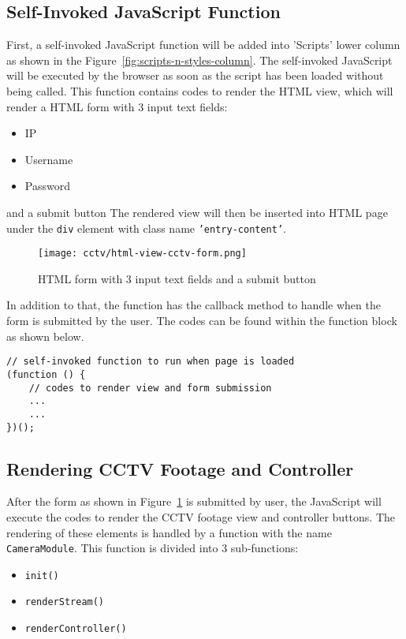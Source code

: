 \subsection{Self-Invoked JavaScript Function}
First, a self-invoked JavaScript function will be added into 'Scripts' lower column as shown in the Figure~\ref{fig:scripts-n-styles-column}. The self-invoked JavaScript will be executed by the browser as soon as the script has been loaded without being called. This function contains codes to render the HTML view, which will render a HTML form with 3 input text fields:
\begin{itemize}
\item IP
\item Username
\item Password
\end{itemize}
and a submit button The rendered view will then be inserted into HTML page under the \texttt{div} element with class name \texttt{'entry-content'}.

\begin{figure}[h]
\caption{HTML form with 3 input text fields and a submit button}
\label{fig:html-view-cctv-form}
\centering
\texttt{[image: cctv/html-view-cctv-form.png]}
\end{figure}

In addition to that, the function has the callback method to handle when the form is submitted by the user. The codes can be found within the function block as shown below.
\begin{lstlisting}
// self-invoked function to run when page is loaded
(function () {
	// codes to render view and form submission
	...
	...
})();
\end{lstlisting}

\subsection{Rendering CCTV Footage and Controller} \label{sec:cctv-rendering-camera-module}
After the form as shown in Figure~\ref{fig:html-view-cctv-form} is submitted by user, the JavaScript will execute the codes to render the CCTV footage view and controller buttons. The rendering of these elements is handled by a function with the name \texttt{CameraModule}. This function is divided into 3 sub-functions:
\begin{itemize}
\item \texttt{init()}
\item \texttt{renderStream()}
\item \texttt{renderController()}
\end{itemize}

